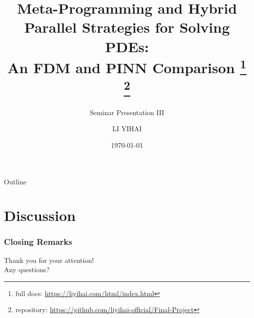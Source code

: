 \documentclass{my-Presentation}
\title[An FDM and PINN Comparison]{
  Meta-Programming and Hybrid Parallel Strategies for Solving PDEs: \\An FDM and PINN Comparison
  \footnote{full docs: \url{https://liyihai.com/html/index.html}}
  \footnote{repository: \url{https://github.com/liyihai-official/Final-Project}}
}
\subtitle{Seminar Presentation III}
\author[LI Yihai]{
  \normalsize
  LI YIHAI \\[1ex]
  \vspace*{-.5em}
}
\institute[Mathematics Institute]{
  Student ID: 23345919 \\[1ex]
  Supervision: Michael Peardon
}
\date{\today \vspace*{-1em}}
\begin{document}
\begin{frame}
  \titlepage
\end{frame}

\begin{frame}{Outline}
  \begin{multicols}{2}
    \tableofcontents
  \end{multicols}
\end{frame}








\section{Discussion}
\begin{frame}
  \frametitle{}

  

\end{frame}



  




\begin{frame}
  \frametitle{Closing Remarks}
  \centering
  {\Large Thank you for your attention!}\\
  \vspace{2em}
  {\large Any questions?}
\end{frame}


\end{document}

